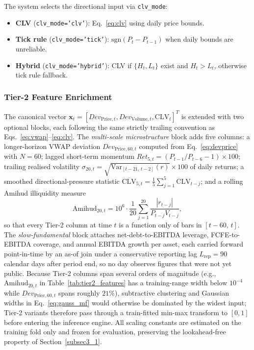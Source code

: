 \documentclass[pdflatex,sn-mathphys-num]{sn-jnl}
\theoremstyle{thmstyleone}
\theoremstyle{thmstyletwo}
\theoremstyle{thmstylethree}
\begin{document}
The system selects the directional input via \texttt{clv\_mode}:
\begin{itemize}
    \item \textbf{CLV} (\texttt{clv\_mode='clv'}): Eq.~\eqref{eq:clv} using daily price bounds.
    \item \textbf{Tick rule} (\texttt{clv\_mode='tick'}): $\mathrm{sgn}(P_t - P_{t-1})$ when daily bounds are unreliable.
    \item \textbf{Hybrid} (\texttt{clv\_mode='hybrid'}): CLV if $\{H_t, L_t\}$ exist and $H_t > L_t$, otherwise tick rule fallback.
\end{itemize}

\subsubsection{Tier-2 Feature Enrichment}\label{subsubsec3_1_2}

The canonical vector $\mathbf{x}_t = [Dev_{\mathrm{Price},t}, Dev_{\mathrm{Volume},t}, \mathrm{CLV}_t]^T$ is extended with two optional blocks, each following the same strictly trailing convention as Eqs.~\eqref{eq:vwap}--\eqref{eq:clv}. The \emph{multi-scale microstructure} block adds five columns: a longer-horizon VWAP deviation $Dev_{\mathrm{Price},60,t}$ computed from Eq.~\eqref{eq:devprice} with $N = 60$; lagged short-term momentum $Ret_{5,t} = (P_{t-1}/P_{t-6} - 1)\times 100$; trailing realised volatility $\sigma_{20,t} = \sqrt{\mathrm{Var}_{[t-21,\,t-2]}(r)}\times 100$ of daily returns; a smoothed directional-pressure statistic $\overline{\mathrm{CLV}}_{5,t} = \frac{1}{5}\sum_{j=1}^{5} \mathrm{CLV}_{t-j}$; and a rolling Amihud illiquidity measure~\cite{amihud2002}
\begin{equation}
    \mathrm{Amihud}_{20,t} = 10^{6}\cdot\frac{1}{20}\sum_{j=1}^{20} \frac{|r_{t-j}|}{P_{t-j} V_{t-j}},
    \label{eq:amihud}
\end{equation}
so that every Tier-2 column at time $t$ is a function only of bars in $[t-60,\, t]$. The \emph{slow-fundamental} block attaches net-debt-to-EBITDA leverage, FCFE-to-EBITDA coverage, and annual EBITDA growth per asset, each carried forward point-in-time by an as-of join under a conservative reporting lag $L_{\mathrm{rep}} = 90$ calendar days after period end, so no day observes figures that were not yet public. Because Tier-2 columns span several orders of magnitude (e.g., $\mathrm{Amihud}_{20,t}$ in Table~\ref{tab:tier2_features} has a training-range width below $10^{-4}$ while $Dev_{\mathrm{Price},60,t}$ spans roughly $21\%$), subtractive clustering and Gaussian widths in Eq.~\eqref{eq:gauss_mf} would otherwise be dominated by the widest input; Tier-2 variants therefore pass through a train-fitted min-max transform to $[0,1]$ before entering the inference engine. All scaling constants are estimated on the training fold only and frozen for evaluation, preserving the lookahead-free property of Section~\ref{subsec3_1}.
\end{document}
